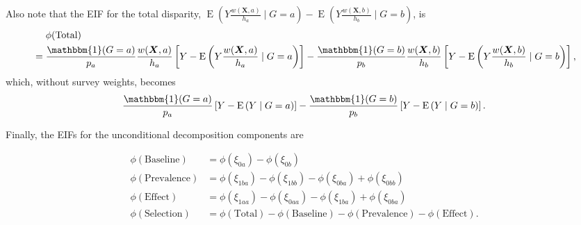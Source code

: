 \documentclass[12pt,a4paper]{article}
\newcommand{\E}{\operatorname{E}}
\def\X{{\boldsymbol X}}
\def\one{\mathbbm{1}}
\begin{document}
Also note that the EIF for the total disparity, $\E \left(Y \frac{w(\X,a)}{h_{a}} \mid G=a \right) - \E \left(Y \frac{w(\X,b)}{h_{b}} \mid G=b \right)$, is 
\begin{align*}
    &\phantom{{}={}} \phi(\text{Total}) \\
    &= \frac{\one(G=a)}{p_a}\frac{w(\X,a)}{h_a} \left[Y - \E\left(Y \frac{w(\X,a)}{h_a} \mid G=a \right)\right] - \frac{\one(G=b)}{p_b}\frac{w(\X,b)}{h_b}  \left[Y - \E \left(Y \frac{w(\X,b)}{h_b} \mid G=b \right)\right],
\end{align*}
which, without survey weights, becomes
\begin{equation*}
    \frac{\one(G=a)}{p_a} \left[Y - \E\left(Y \mid G=a \right)\right] - \frac{\one(G=b)}{p_b} \left[Y - \E \left(Y \mid G=b \right)\right].
\end{equation*}


Finally, the EIFs for the unconditional decomposition components are 

\begin{align*}
    \phi(\text{Baseline}) &= \phi(\xi_{0a})-\phi(\xi_{0b})  \\
    \phi(\text{Prevalence}) &= \phi(\xi_{1ba})-\phi(\xi_{1bb})-\phi(\xi_{0ba})+\phi(\xi_{0bb}) \\
    \phi(\text{Effect}) &= \phi(\xi_{1aa})-\phi(\xi_{0aa}) - \phi(\xi_{1ba})+\phi(\xi_{0ba}) \\
    \phi(\text{Selection}) &= \phi(\text{Total}) - \phi(\text{Baseline}) - \phi(\text{Prevalence}) - \phi(\text{Effect}) .
\end{align*}
\end{document}
